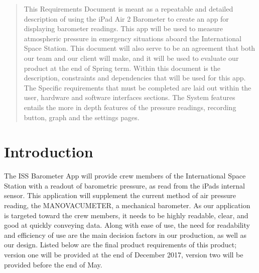 \documentclass[onecolumn, draftclsnofoot,10pt, compsoc]{IEEEtran}
\def \CapstoneProjectName{ISS Barometer App }
\begin{document}
\begin{titlepage}
\begin{singlespace}
{{            }
            \vspace{20pt}
        }
        \begin{abstract}
This Requirements Document is meant as a repeatable and detailed description of using the iPad Air 2 Barometer to create an app for displaying barometer readings.
This app will be used to measure atmospheric pressure in emergency situations aboard the International Space Station.
This document will also serve to be an agreement that both our team and our client will make, and it will be used to evaluate our product at the end of Spring term.
Within this document is the description, constraints and dependencies that will be used for this app.
The Specific requirements that must be completed are laid out within the user, hardware and software interfaces sections.
The System features entails the more in depth features of the pressure readings, recording button, graph and the settings pages.
        \end{abstract}
    \end{singlespace}
\end{titlepage}
\newpage
{}
\tableofcontents
\clearpage

\section{Introduction}
The \CapstoneProjectName will provide crew members of the International Space Station with a readout of barometric pressure, as read from the iPads internal sensor.
This application will supplement the current method of air pressure reading, the MANOVACUMETER, a mechanical barometer.
As our application is targeted toward the crew members, it needs to be highly readable, clear, and good at quickly conveying data.
Along with ease of use, the need for readability and efficiency of use are the main decision factors in our production, as well as our design.
Listed below are the final product requirements of this product; version one will be provided at the end of December 2017, version two will be provided before the end of May.
\end{document}
